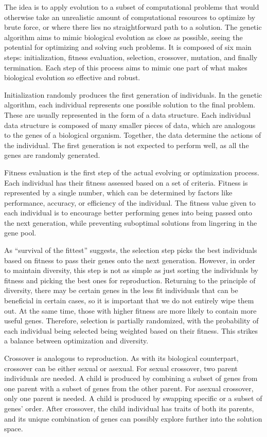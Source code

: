 \documentclass[12pt]{article}
\begin{document}
The idea is to apply evolution to a subset of computational problems that would otherwise take an unrealistic amount of computational resources to optimize by brute force, or where there lies no straightforward path to a solution. The genetic algorithm aims to mimic biological evolution as close as possible, seeing the potential for optimizing and solving such problems. It is composed of six main steps: initialization, fitness evaluation, selection, crossover, mutation, and finally termination. Each step of this process aims to mimic one part of what makes biological evolution so effective and robust.

Initialization randomly produces the first generation of individuals. In the genetic algorithm, each individual represents one possible solution to the final problem. These are usually represented in the form of a data structure. Each individual data structure is composed of many smaller pieces of data, which are analogous to the genes of a biological organism. Together, the data determine the actions of the individual. The first generation is not expected to perform well, as all the genes are randomly generated.

Fitness evaluation is the first step of the actual evolving or optimization process. Each individual has their fitness assessed based on a set of criteria. Fitness is represented by a single number, which can be determined by factors like performance, accuracy, or efficiency of the individual. The fitness value given to each individual is to encourage better performing genes into being passed onto the next generation, while preventing suboptimal solutions from lingering in the gene pool.

As ``survival of the fittest'' suggests, the selection step picks the best individuals based on fitness to pass their genes onto the next generation. However, in order to maintain diversity, this step is not as simple as just sorting the individuals by fitness and picking the best ones for reproduction. Returning to the principle of diversity, there may be certain genes in the less fit individuals that can be beneficial in certain cases, so it is important that we do not entirely wipe them out. At the same time, those with higher fitness are more likely to contain more useful genes. Therefore, selection is partially randomized, with the probability of each individual being selected being weighted based on their fitness. This strikes a balance between optimization and diversity.

Crossover is analogous to reproduction. As with its biological counterpart, crossover can be either sexual or asexual. For sexual crossover, two parent individuals are needed. A child is produced by combining a subset of genes from one parent with a subset of genes from the other parent. For asexual crossover, only one parent is needed. A child is produced by swapping specific or a subset of genes' order. After crossover, the child individual has traits of both its parents, and its unique combination of genes can possibly explore further into the solution space.
\end{document}
